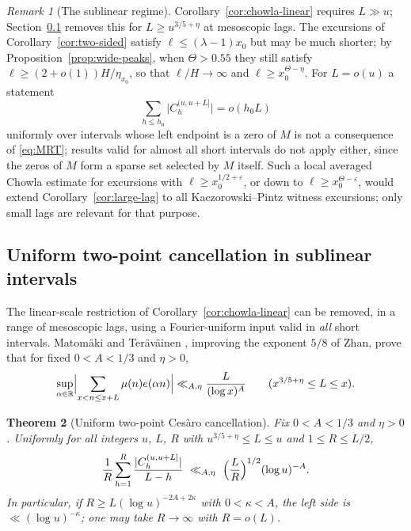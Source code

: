\documentclass[11pt]{amsart}
\numberwithin{equation}{section}
\theoremstyle{plain}
\newtheorem{theorem}{Theorem}[section]
\theoremstyle{definition}
\theoremstyle{remark}
\newtheorem{remark}[theorem]{Remark}
\newcommand{\eps}{\varepsilon}
\begin{document}
\begin{remark}[The sublinear regime]
\label{rem:sublinear-chowla}
Corollary~\ref{cor:chowla-linear} requires $L\gg u$; Section~\ref{subsec:sublinear-chowla}
removes this for $L\ge u^{3/5+\eta}$ at mesoscopic lags. The excursions of
Corollary~\ref{cor:two-sided} satisfy $\ell\le(\lambda-1)x_0$ but may be
much shorter; by Proposition~\ref{prop:wide-peaks}, when $\Theta>0.55$ they
still satisfy $\ell\ge(2+o(1))H/\eta_{x_0}$, so that $\ell/H\to\infty$ and
$\ell\ge x_0^{\Theta-\eta}$. For $L=o(u)$ a statement
\[
\sum_{h\le h_0}\bigl|C^{(u,u+L]}_h\bigr|=o(h_0L)
\]
uniformly over intervals whose left endpoint is a zero of $M$ is not a
consequence of \eqref{eq:MRT}; results valid for almost all short intervals
do not apply either, since the zeros of $M$ form a sparse set selected by
$M$ itself. Such a local averaged Chowla estimate for excursions with
$\ell\ge x_0^{1/2+\eps}$, or down to $\ell\ge x_0^{\Theta-\eps}$, would
extend Corollary~\ref{cor:large-lag} to all Kaczorowski--Pintz witness
excursions; only small lags are relevant for that purpose.
\end{remark}

\subsection{Uniform two-point cancellation in sublinear intervals}
\label{subsec:sublinear-chowla}

The linear-scale restriction of Corollary~\ref{cor:chowla-linear} can be
removed, in a range of mesoscopic lags, using a Fourier-uniform input valid
in \emph{all} short intervals. Matom\"aki and Ter\"av\"ainen
\cite[Theorem~1.5]{MatomakiTeravainen2023}, improving the exponent $5/8$ of
Zhan, prove that for fixed $0<A<1/3$ and $\eta>0$,
\begin{equation}
\label{eq:MT-fourier}
\sup_{\alpha\in\mathbb R}\Bigl|\sum_{x<n\le x+L}\mu(n)e(\alpha n)\Bigr|
\ll_{A,\eta}\frac{L}{(\log x)^{A}}
\qquad(x^{3/5+\eta}\le L\le x).
\end{equation}

\begin{theorem}[Uniform two-point Ces\`aro cancellation]
\label{thm:sublinear-two-point}
Fix $0<A<1/3$ and $\eta>0$. Uniformly for all integers $u$, $L$, $R$ with
$u^{3/5+\eta}\le L\le u$ and $1\le R\le L/2$,
\[
\frac1R\sum_{h=1}^{R}\frac{|C^{(u,u+L]}_h|}{L-h}
\ \ll_{A,\eta}\ \Bigl(\frac LR\Bigr)^{1/2}(\log u)^{-A}.
\]
In particular, if $R\ge L(\log u)^{-2A+2\kappa}$ with $0<\kappa<A$, the
left side is $\ll(\log u)^{-\kappa}$; one may take $R\to\infty$ with
$R=o(L)$.
\end{theorem}
\end{document}
